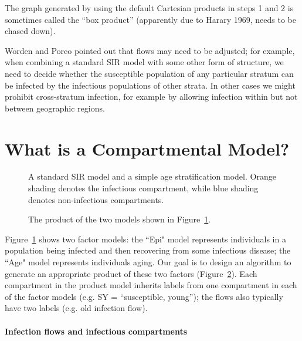 The graph generated by using the default Cartesian products in steps 1 and 2 is sometimes called the “box product” (apparently due to Harary 1969, needs to be chased down).

Worden and Porco pointed out that flows may need to be adjusted; for example, when combining a standard SIR model with some other form of structure, we need to decide whether the susceptible population of any particular stratum can be infected by the infectious populations of other strata.
In other cases we might prohibit cross-stratum infection, for example by allowing infection within but not between geographic regions. 

\section{What is a Compartmental Model?}\label{dcm}

\begin{figure}
    \centering
    
    \caption{A standard SIR model and a simple age stratification model. Orange shading denotes the infectious compartment, while blue shading denotes non-infectious compartments.}
    \label{fig:sir_age_strat}
\end{figure}

\begin{figure}
    \centering
    
    \caption{The product of the two models shown in Figure~\ref{fig:sir_age_strat}. }
    \label{fig:simple_sir_age}
\end{figure}

Figure~\ref{fig:sir_age_strat} shows two factor models: the ``Epi" model represents individuals in a population being infected and then recovering from some infectious disease; the ``Age" model represents individuals aging. Our goal is to design an algorithm to generate an appropriate product of these two factors (Figure~\ref{fig:simple_sir_age}). Each compartment in the product model inherits labels from one compartment in each of the factor models (e.g. SY = ``susceptible, young''); the flows also typically have two labels (e.g. old infection flow). 

\paragraph{Infection flows and infectious compartments}

